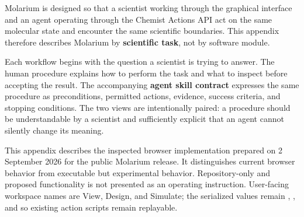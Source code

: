 \documentclass[11pt]{article}
\begin{document}
\newenvironment{skillcontract}[1]{%
  \par\nopagebreak[4]\vspace{2pt}%
  {\normalsize\bfseries Agent skill contract: \code{#1}}\par\vspace{1pt}%
  \footnotesize
  \begin{longtable}{@{}K V@{}}
  \toprule
  \textbf{Contract element} & \textbf{Requirement}\\
  \midrule
  \endfirsthead
  \toprule
  \textbf{Contract element} & \textbf{Requirement}\\
  \midrule
  \endhead
  \midrule
  \multicolumn{2}{r}{\footnotesize Continued on next page}\\
  \endfoot
  \bottomrule
  \endlastfoot
}{%
  \end{longtable}
  \small}
\newcommand{\contractrow}[2]{#1 & #2\\}

\newenvironment{smallcomparison}[1]{%
  \par\vspace{2pt}\footnotesize
  \begin{longtable}{@{}#1@{}}\toprule
}{%
  \bottomrule\end{longtable}
  \small}

Molarium is designed so that a scientist working through the graphical interface and an agent operating through the Chemist Actions API act on the same molecular state and encounter the same scientific boundaries. This appendix therefore describes Molarium by \textbf{scientific task}, not by software module.

Each workflow begins with the question a scientist is trying to answer. The human procedure explains how to perform the task and what to inspect before accepting the result. The accompanying \textbf{agent skill contract} expresses the same procedure as preconditions, permitted actions, evidence, success criteria, and stopping conditions. The two views are intentionally paired: a procedure should be understandable by a scientist and sufficiently explicit that an agent cannot silently change its meaning.

This appendix describes the inspected browser implementation prepared on 2 September 2026 for the public Molarium release. It distinguishes current browser behavior from executable but experimental behavior. Repository-only and proposed functionality is not presented as an operating instruction. User-facing workspace names are View, Design, and Simulate; the serialized values remain , , and  so existing action scripts remain replayable.
\end{document}
